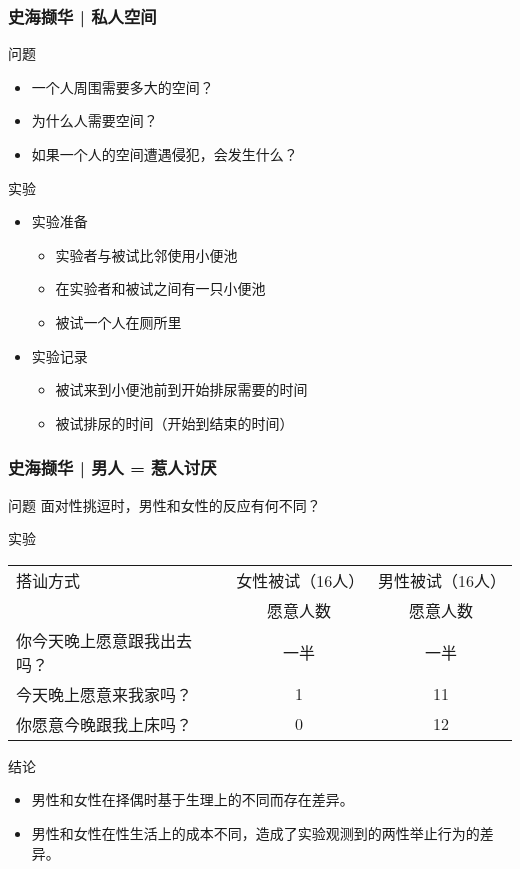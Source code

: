 \begin{frame}
  \frametitle{史海撷华 | 私人空间}
  \begin{block}{问题}
    \begin{itemize}
      \item 一个人周围需要多大的空间？
      \item 为什么人需要空间？
      \item 如果一个人的空间遭遇侵犯，会发生什么？
    \end{itemize}
  \end{block}
  \pause
  \begin{block}{实验}
    \begin{itemize}
      \item 实验准备
        \begin{itemize}
          \item 实验者与被试比邻使用小便池
          \item 在实验者和被试之间有一只小便池
          \item 被试一个人在厕所里
        \end{itemize}
      \item 实验记录
        \begin{itemize}
          \item 被试来到小便池前到开始排尿需要的时间
          \item 被试排尿的时间（开始到结束的时间）
        \end{itemize}
    \end{itemize}
  \end{block}
\end{frame}

\begin{frame}
  \frametitle{史海撷华 | 男人 = 惹人讨厌}
  \begin{block}{问题}
    面对性挑逗时，男性和女性的反应有何不同？
  \end{block}
  \pause
  \begin{block}{实验}
  \begin{tabular}{lcc}
    \hline
    搭讪方式 & 女性被试（16人） & 男性被试（16人）\\
    & 愿意人数 & 愿意人数\\
    \hline
    你今天晚上愿意跟我出去吗？ & 一半 & 一半\\
    今天晚上愿意来我家吗？ & 1 & 11\\
    你愿意今晚跟我上床吗？ & 0 & 12\\
    \hline
  \end{tabular}
  \end{block}
  \pause
  \begin{block}{结论}
    \begin{itemize}
      \item 男性和女性在择偶时基于生理上的不同而存在差异。
      \item 男性和女性在性生活上的成本不同，造成了实验观测到的两性举止行为的差异。
    \end{itemize}
  \end{block}
\end{frame}

